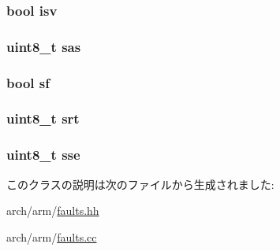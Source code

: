 \hypertarget{classArmISA_1_1DataAbort_ab98211392ddb1f356f10c5688f55ec06}{
\subsubsection[{isv}]{\setlength{\rightskip}{0pt plus 5cm}bool {\bf isv}}}
\label{classArmISA_1_1DataAbort_ab98211392ddb1f356f10c5688f55ec06}
\hypertarget{classArmISA_1_1DataAbort_a1186084bdb2d7947ab58dac309bb3557}{
\subsubsection[{sas}]{\setlength{\rightskip}{0pt plus 5cm}uint8\_\-t {\bf sas}}}
\label{classArmISA_1_1DataAbort_a1186084bdb2d7947ab58dac309bb3557}
\hypertarget{classArmISA_1_1DataAbort_a9da2d5806018a5e01c9898d9c751ebb6}{
\subsubsection[{sf}]{\setlength{\rightskip}{0pt plus 5cm}bool {\bf sf}}}
\label{classArmISA_1_1DataAbort_a9da2d5806018a5e01c9898d9c751ebb6}
\hypertarget{classArmISA_1_1DataAbort_a46e1e6d22b710c280f39d97cb7ea8de9}{
\subsubsection[{srt}]{\setlength{\rightskip}{0pt plus 5cm}uint8\_\-t {\bf srt}}}
\label{classArmISA_1_1DataAbort_a46e1e6d22b710c280f39d97cb7ea8de9}
\hypertarget{classArmISA_1_1DataAbort_abba3874a6247f0df00a9dcc659cc2d67}{
\subsubsection[{sse}]{\setlength{\rightskip}{0pt plus 5cm}uint8\_\-t {\bf sse}}}
\label{classArmISA_1_1DataAbort_abba3874a6247f0df00a9dcc659cc2d67}


このクラスの説明は次のファイルから生成されました:\begin{DoxyCompactItemize}
\item 
arch/arm/\hyperlink{arch_2arm_2faults_8hh}{faults.hh}\item 
arch/arm/\hyperlink{arch_2arm_2faults_8cc}{faults.cc}\end{DoxyCompactItemize}
